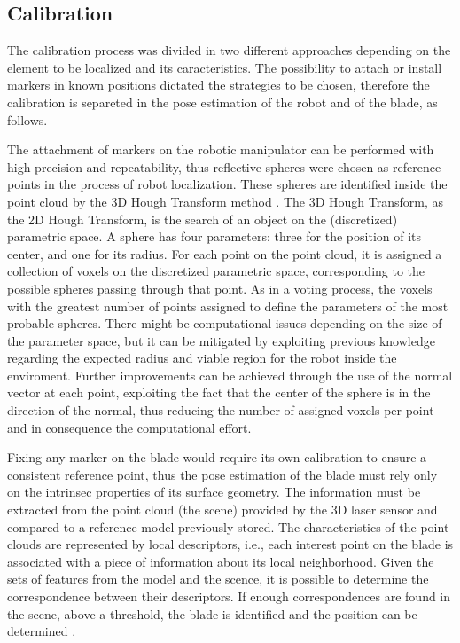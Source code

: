 \subsection{Calibration}
 
The calibration process was divided in two different approaches depending on the
element to be localized and its caracteristics. The possibility to attach or
install markers in known positions dictated the strategies to be chosen,
therefore the calibration is separeted in the pose estimation of the robot and
of the blade, as follows.
   
The attachment of markers on the robotic manipulator can be performed with high
precision and repeatability, thus reflective spheres were chosen as reference
points in the process of robot localization. These spheres are identified inside
the point cloud by the 3D Hough Transform method \cite{camurri20143d}. The 3D
Hough Transform, as the 2D Hough Transform, is the search of an object on the
(discretized) parametric space. A sphere has four parameters: three for the
position of its center, and one for its radius. For each point on the point
cloud, it is assigned a collection of voxels on the discretized parametric
space, corresponding to the possible spheres passing through that point. As in a
voting process, the voxels with the greatest number of points assigned to define
the parameters of the most probable spheres. There might be computational issues
depending on the size of the parameter space, but it can be mitigated by
exploiting previous knowledge regarding the expected radius and viable region
for the robot inside the enviroment. Further improvements can be achieved
through the use of the normal vector at each point, exploiting the fact that
the center of the sphere is in the direction of the normal, thus reducing the
number of assigned voxels per point and in consequence the computational effort.

Fixing any marker on the blade would require its own calibration to ensure a
consistent reference point, thus the pose estimation of the blade must rely only
on the intrinsec properties of its surface geometry. The information must be extracted from
the point cloud (the scene) provided by the 3D laser sensor and
compared to a reference model previously stored. The characteristics of the point clouds are represented
by local descriptors, i.e., each interest point on the blade is associated
with a piece of information about its local neighborhood. Given the
sets of features from the model and the scence,  it is possible to determine the
correspondence between their descriptors. If enough correspondences are found
in the scene, above a threshold, the blade is identified and the position can be
determined \cite{Tombari2010a}.

